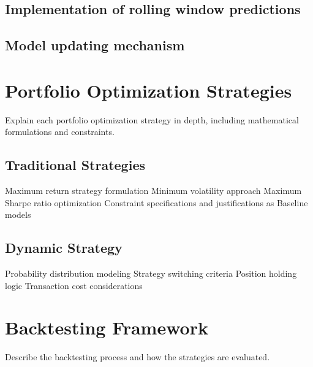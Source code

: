 \subsection{Implementation of rolling window predictions}
\subsection{Model updating mechanism}

\section{Portfolio Optimization Strategies}
Explain each portfolio optimization strategy in depth, including mathematical formulations and constraints.
\subsection{Traditional Strategies}
Maximum return strategy formulation
Minimum volatility approach
Maximum Sharpe ratio optimization
Constraint specifications and justifications as Baseline models
\subsection{Dynamic Strategy}
Probability distribution modeling
Strategy switching criteria
Position holding logic
Transaction cost considerations

\section{Backtesting Framework}
Describe the backtesting process and how the strategies are evaluated.


